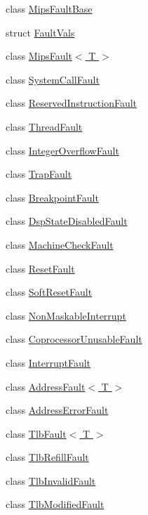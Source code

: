 \begin{DoxyCompactItemize}
\item 
class \hyperlink{classMipsISA_1_1MipsFaultBase}{MipsFaultBase}
\item 
struct \hyperlink{structMipsISA_1_1MipsFaultBase_1_1FaultVals}{FaultVals}
\item 
class \hyperlink{classMipsISA_1_1MipsFault}{MipsFault$<$ T $>$}
\item 
class \hyperlink{classMipsISA_1_1SystemCallFault}{SystemCallFault}
\item 
class \hyperlink{classMipsISA_1_1ReservedInstructionFault}{ReservedInstructionFault}
\item 
class \hyperlink{classMipsISA_1_1ThreadFault}{ThreadFault}
\item 
class \hyperlink{classMipsISA_1_1IntegerOverflowFault}{IntegerOverflowFault}
\item 
class \hyperlink{classMipsISA_1_1TrapFault}{TrapFault}
\item 
class \hyperlink{classMipsISA_1_1BreakpointFault}{BreakpointFault}
\item 
class \hyperlink{classMipsISA_1_1DspStateDisabledFault}{DspStateDisabledFault}
\item 
class \hyperlink{classMipsISA_1_1MachineCheckFault}{MachineCheckFault}
\item 
class \hyperlink{classMipsISA_1_1ResetFault}{ResetFault}
\item 
class \hyperlink{classMipsISA_1_1SoftResetFault}{SoftResetFault}
\item 
class \hyperlink{classMipsISA_1_1NonMaskableInterrupt}{NonMaskableInterrupt}
\item 
class \hyperlink{classMipsISA_1_1CoprocessorUnusableFault}{CoprocessorUnusableFault}
\item 
class \hyperlink{classMipsISA_1_1InterruptFault}{InterruptFault}
\item 
class \hyperlink{classMipsISA_1_1AddressFault}{AddressFault$<$ T $>$}
\item 
class \hyperlink{classMipsISA_1_1AddressErrorFault}{AddressErrorFault}
\item 
class \hyperlink{classMipsISA_1_1TlbFault}{TlbFault$<$ T $>$}
\item 
class \hyperlink{classMipsISA_1_1TlbRefillFault}{TlbRefillFault}
\item 
class \hyperlink{classMipsISA_1_1TlbInvalidFault}{TlbInvalidFault}
\item 
class \hyperlink{classMipsISA_1_1TlbModifiedFault}{TlbModifiedFault}
\end{DoxyCompactItemize}
